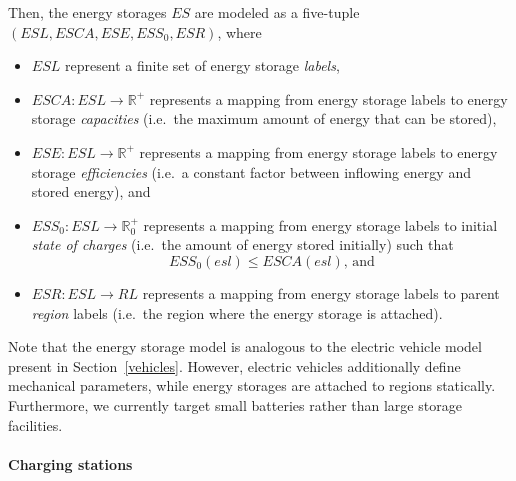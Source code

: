 Then, the energy storages $ES$ are modeled as a five-tuple $(ESL, ESCA, ESE, ESS_0, ESR)$, where
\begin{itemize}
	\item $ESL$ represent a finite set of energy storage \textit{labels},
	\item $ESCA: ESL \rightarrow \mathbb{R}^+$ represents a mapping from energy storage labels to energy storage \textit{capacities} (i.e.\ the maximum amount of energy that can be stored),
	\item $ESE: ESL \rightarrow \mathbb{R}^+$ represents a mapping from energy storage labels to energy storage \textit{efficiencies} (i.e.\ a constant factor between inflowing energy and stored energy), and
	\item $ESS_0: ESL \rightarrow \mathbb{R}_0^+$ represents a mapping from energy storage labels to initial \textit{state of charges} (i.e.\ the amount of energy stored initially) such that
	\[
		ESS_0(esl) \leq ESCA(esl) \textrm{, and}
	\]
	\item $ESR: ESL \rightarrow RL$ represents a mapping from energy storage labels to parent \textit{region} labels (i.e.\ the region where the energy storage is attached).
\end{itemize}
Note that the energy storage model is analogous to the electric vehicle model present in Section~\ref{vehicles}. However, electric vehicles additionally define mechanical parameters, while energy storages are attached to regions statically. Furthermore, we currently target small batteries rather than large storage facilities. 

\paragraph{Charging stations}
\label{charging_stations}

